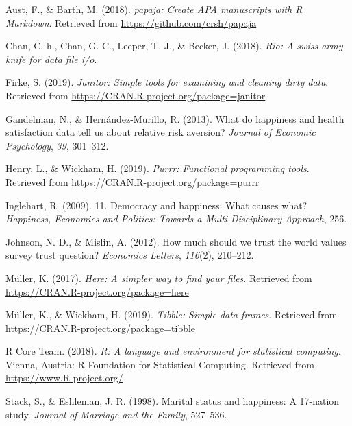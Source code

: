 \documentclass[man,floatsintext]{apa6}
\begin{document}
\begingroup
\setlength{\parindent}{-0.5in}
\setlength{\leftskip}{0.5in}

\hypertarget{refs}{}
\leavevmode\hypertarget{ref-R-papaja}{}%
Aust, F., \& Barth, M. (2018). \emph{papaja: Create APA manuscripts with R Markdown}. Retrieved from \url{https://github.com/crsh/papaja}

\leavevmode\hypertarget{ref-R-rio}{}%
Chan, C.-h., Chan, G. C., Leeper, T. J., \& Becker, J. (2018). \emph{Rio: A swiss-army knife for data file i/o}.

\leavevmode\hypertarget{ref-R-janitor}{}%
Firke, S. (2019). \emph{Janitor: Simple tools for examining and cleaning dirty data}. Retrieved from \url{https://CRAN.R-project.org/package=janitor}

\leavevmode\hypertarget{ref-gandelman2013happiness}{}%
Gandelman, N., \& Hernández-Murillo, R. (2013). What do happiness and health satisfaction data tell us about relative risk aversion? \emph{Journal of Economic Psychology}, \emph{39}, 301--312.

\leavevmode\hypertarget{ref-R-purrr}{}%
Henry, L., \& Wickham, H. (2019). \emph{Purrr: Functional programming tools}. Retrieved from \url{https://CRAN.R-project.org/package=purrr}

\leavevmode\hypertarget{ref-inglehart200911}{}%
Inglehart, R. (2009). 11. Democracy and happiness: What causes what? \emph{Happiness, Economics and Politics: Towards a Multi-Disciplinary Approach}, 256.

\leavevmode\hypertarget{ref-johnson2012much}{}%
Johnson, N. D., \& Mislin, A. (2012). How much should we trust the world values survey trust question? \emph{Economics Letters}, \emph{116}(2), 210--212.

\leavevmode\hypertarget{ref-R-here}{}%
Müller, K. (2017). \emph{Here: A simpler way to find your files}. Retrieved from \url{https://CRAN.R-project.org/package=here}

\leavevmode\hypertarget{ref-R-tibble}{}%
Müller, K., \& Wickham, H. (2019). \emph{Tibble: Simple data frames}. Retrieved from \url{https://CRAN.R-project.org/package=tibble}

\leavevmode\hypertarget{ref-R-base}{}%
R Core Team. (2018). \emph{R: A language and environment for statistical computing}. Vienna, Austria: R Foundation for Statistical Computing. Retrieved from \url{https://www.R-project.org/}

\leavevmode\hypertarget{ref-stack1998marital}{}%
Stack, S., \& Eshleman, J. R. (1998). Marital status and happiness: A 17-nation study. \emph{Journal of Marriage and the Family}, 527--536.
\end{document}
